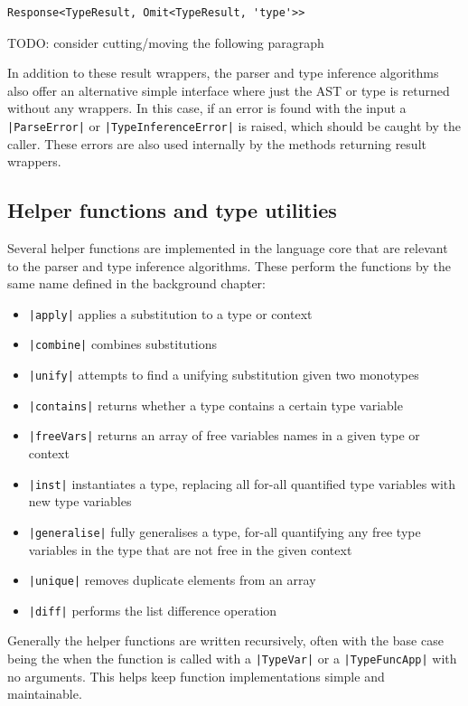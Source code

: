 \documentclass[a4paper,fleqn,twoside,12pt]{report}
\begin{document}
\begin{verbatim}
Response<TypeResult, Omit<TypeResult, 'type'>>
\end{verbatim}

TODO: consider cutting/moving the following paragraph

In addition to these result wrappers, the parser and type inference algorithms also offer an alternative simple interface where just the AST or type is returned without any wrappers. In this case, if an error is found with the input a \texttt{|ParseError|} or \texttt{|TypeInferenceError|} is raised, which should be caught by the caller. These errors are also used internally by the methods returning result wrappers.
\subsection{Helper functions and type utilities}\label{id:h.sw77qek8b49p}
Several helper functions are implemented in the language core that are relevant to the parser and type inference algorithms. These perform the functions by the same name defined in the background chapter:
\begin{itemize}
  \item \texttt{|apply|} applies a substitution to a type or context
  \item \texttt{|combine|} combines substitutions
  \item \texttt{|unify|} attempts to find a unifying substitution given two monotypes
  \item \texttt{|contains|} returns whether a type contains a certain type variable
  \item \texttt{|freeVars|} returns an array of free variables names in a given type or context
  \item \texttt{|inst|} instantiates a type, replacing all for-all quantified type variables with new type variables
  \item \texttt{|generalise|} fully generalises a type, for-all quantifying any free type variables in the type that are not free in the given context
  \item \texttt{|unique|} removes duplicate elements from an array
  \item \texttt{|diff|} performs the list difference operation
\end{itemize}

Generally the helper functions are written recursively, often with the base case being the when the function is called with a \texttt{|TypeVar|} or a \texttt{|TypeFuncApp|} with no arguments. This helps keep function implementations simple and maintainable.
\end{document}
